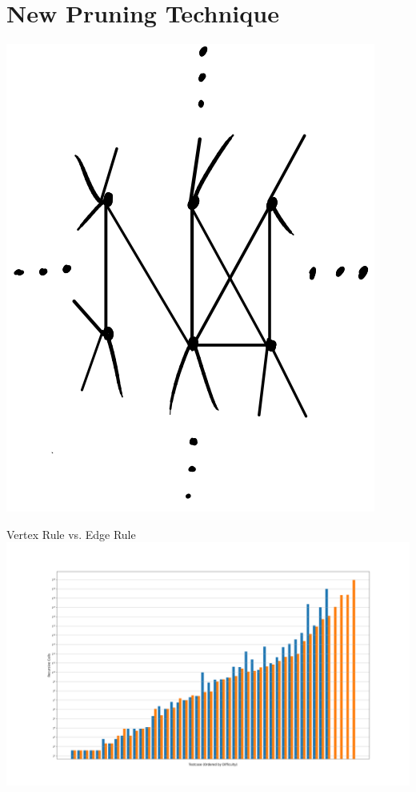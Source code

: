 \documentclass[12pt]{article}
\begin{document}
\newpage
\section*{New Pruning Technique}

    \begin{center} \includegraphics{fig19.png} \end{center}


\newpage
\begin{center} Vertex Rule vs. Edge Rule\\\includegraphics[scale=.5]{vertexedge.png} \end{center}
\end{document}
